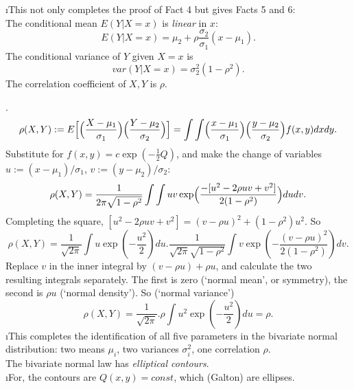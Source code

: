 \documentclass[12pt]{article}
\begin{document}
\i This not only completes the proof of Fact 4 but gives Facts 5 and 6:\\
 The conditional mean $E(Y \vert X = x)$ is {\it linear} in $x$:
\[
E(Y \vert X = x) = {\mu}_2 + \rho \frac{{\sigma}_2}{{\sigma}_1} (x
- {\mu}_1).
\]
 The conditional
variance of $Y$ given $X = x$
is
\[
var(Y \vert X = x) = {\sigma}_2^2 (1 - {\rho}^2).
\]
 The correlation coefficient of $X,Y$ is
$\rho$.

.
\[
\rho(X,Y) := E \Bigl[\Bigl(\frac{X - {\mu}_1}{{\sigma}_1}\Bigr)
\Bigl(\frac{Y - {\mu}_2}{{\sigma}_2}\Bigr)\Bigr] =
\int\int\Bigl(\frac{x - {\mu}_1}{{\sigma}_1}\Bigr) \Bigl(\frac{y -
{\mu}_2}{{\sigma}_2}\Bigr) f(x,y) dx dy.
\]
Substitute for $f(x,y) = c \exp(-\frac{1}{2}Q)$, and make the
change of variables $u:= (x - {\mu}_1)/{\sigma}_1$, $v := (y
-{\mu}_2)/{\sigma}_2$:
\[
\rho(X,Y) = \frac{1}{2 \pi \sqrt{1 - {\rho}^2}} \int \int uv \exp
\Bigl(\frac{-[u^2 - 2 \rho uv + v^2]}{2(1 - {\rho}^2)}\Bigr) dudv.
\]
Completing the square, $[u^2 - 2 \rho uv + v^2] = (v -
\rho u)^2 + (1 - {\rho}^2) u^2$.  So
\[
\rho(X,Y) = \frac{1}{\sqrt{2 \pi}} \int u
\exp\left(-\frac{u^2}{2}\right) du. \frac{1}{\sqrt{2 \pi} \sqrt{1
- {\rho}^2}} \int v \exp\left(-\frac{(v - \rho u)^2}{2(1 -
{\rho}^2)}\right) dv.
\]
Replace $v$ in the inner integral by $(v - \rho u) + \rho u$, and
calculate the two resulting integrals separately.  The first is
zero (`normal mean', or symmetry), the second is $\rho u$ (`normal
density').  So (`normal variance')
\[
\rho(X,Y) = \frac{1}{\sqrt{2 \pi}}. \rho \int u^2
\exp\left(-\frac{u^2}{2}\right) du = \rho.
\]
\i This completes the identification of all five parameters in the
bivariate normal distribution: two means ${\mu}_i$, two variances
${\sigma}_i^2$, one correlation $\rho$.\\

 The bivariate normal law has {\it elliptical contours}.\\
\i For, the contours are $Q(x,y) = const$, which (Galton) are ellipses.\\
\end{document}
